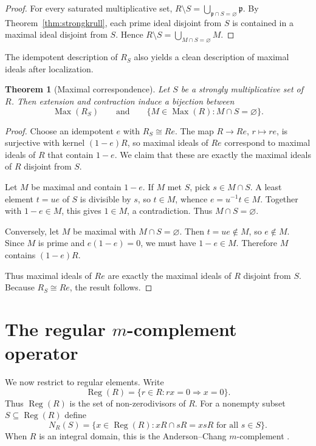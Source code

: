 \documentclass[11pt]{amsart}
\newtheorem{theorem}{Theorem}[section]
\theoremstyle{definition}
\theoremstyle{remark}
\newcommand{\Reg}{\operatorname{Reg}}
\newcommand{\Max}{\operatorname{Max}}
\begin{document}
\begin{proof}
For every saturated multiplicative set,
$R \setminus S=\bigcup_{\mathfrak p \cap S=\varnothing}\mathfrak p.$
By Theorem~\ref{thm:strongkrull}, each prime ideal disjoint from $S$ is contained in a maximal ideal disjoint from $S$.
Hence
$R \setminus S=\bigcup_{M \cap S=\varnothing} M.$
\end{proof}

The idempotent description of $R_S$ also yields a clean description of maximal ideals after localization.

\begin{theorem}[Maximal correspondence]\label{thm:maxcorr}
Let $S$ be a strongly multiplicative set of $R$.
Then extension and contraction induce a bijection between
\[
\Max(R_S)
\qquad\text{and}\qquad
\{M \in \Max(R) : M \cap S=\varnothing\}.
\]
\end{theorem}

\begin{proof}
Choose an idempotent $e$ with $R_S \cong Re$.
The map $R \to Re$, $r \mapsto re$, is surjective with kernel $(1-e)R$, so maximal ideals of $Re$ correspond to maximal ideals of $R$ that contain $1-e$.
We claim that these are exactly the maximal ideals of $R$ disjoint from $S$.

Let $M$ be maximal and contain $1-e$.
If $M$ met $S$, pick $s \in M \cap S$.
A least element $t=ue$ of $S$ is divisible by $s$, so $t \in M$, whence $e=u^{-1}t \in M$.
Together with $1-e \in M$, this gives $1 \in M$, a contradiction.
Thus $M \cap S=\varnothing$.

Conversely, let $M$ be maximal with $M \cap S=\varnothing$.
Then $t=ue \notin M$, so $e \notin M$.
Since $M$ is prime and $e(1-e)=0$, we must have $1-e \in M$.
Therefore $M$ contains $(1-e)R$.

Thus maximal ideals of $Re$ are exactly the maximal ideals of $R$ disjoint from $S$.
Because $R_S \cong Re$, the result follows.
\end{proof}

\section{The regular \texorpdfstring{$m$}{m}-complement operator}

We now restrict to regular elements.
Write
\[
\Reg(R)=\{r \in R : rx=0 \Rightarrow x=0\}.
\]
Thus $\Reg(R)$ is the set of non-zerodivisors of $R$.
For a nonempty subset $S \subseteq \Reg(R)$ define
\[
N_R(S)=\{x \in \Reg(R) : xR \cap sR=xsR \text{ for all } s \in S\}.
\]
When $R$ is an integral domain, this is the Anderson--Chang $m$-complement \cite{AndersonChang}.
\end{document}
